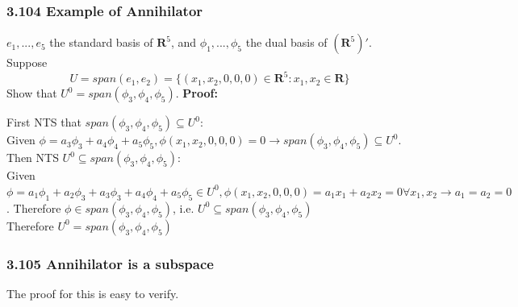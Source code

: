 \documentclass{article}
\begin{document}
\subsubsection*{3.104 Example of Annihilator}
$e_1, ..., e_5$ the standard basis of $\mathbf{R}^5$, and $\phi_1, ..., \phi_5$ the dual basis of $(\mathbf{R}^5)'$. Suppose
\begin{equation*}
    U = span(e_1, e_2) = \{(x_1, x_2, 0, 0, 0) \in \mathbf{R}^5: x_1, x_2 \in \mathbf{R}\}
\end{equation*}
Show that $U^0 = span(\phi_3, \phi_4, \phi_5)$.
\textbf{Proof:}
\begin{addmargin}[1em]{0em}
    First NTS that $span(\phi_3, \phi_4, \phi_5) \subseteq U^0$:\\
    Given $\phi = a_3\phi_3 + a_4\phi_4 + a_5\phi_5, \phi(x_1, x_2, 0, 0, 0) = 0 \rightarrow span(\phi_3, \phi_4, \phi_5) \subseteq U^0$.\\
    Then NTS $U^0 \subseteq span(\phi_3, \phi_4, \phi_5)$:\\
    Given $\phi = a_1\phi_1 + a_2\phi_3 + a_3\phi_3 + a_4\phi_4 + a_5\phi_5 \in U^0, \phi(x_1, x_2, 0, 0, 0) = a_1x_1 + a_2x_2 = 0 \forall x_1, x_2 \rightarrow a_1 = a_2 = 0$. Therefore $\phi \in span(\phi_3, \phi_4, \phi_5)$, i.e. $U^0 \subseteq span(\phi_3, \phi_4, \phi_5)$\\
    Therefore $U^0 = span(\phi_3, \phi_4, \phi_5)$
\end{addmargin}
\subsubsection*{3.105 Annihilator is a subspace}
The proof for this is easy to verify.
\end{document}
